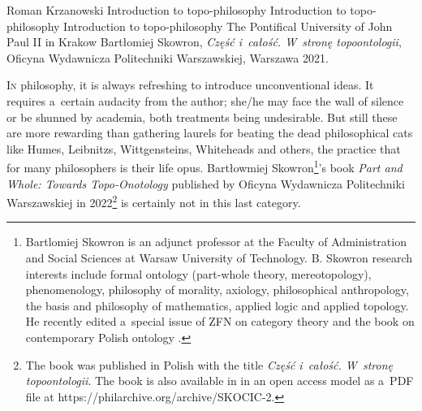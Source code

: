 \begin{newrevengenv}{Roman Krzanowski}
	{Introduction to topo-philosophy}
	{Introduction to topo-philosophy}
	{Introduction to topo-philosophy}
	{The Pontifical University of John Paul II in Krakow}
	{Bartłomiej Skowron, \textit{Część i~całość. W~stronę topoontologii}, Oficyna Wydawnicza Politechniki Warszawskiej, Warszawa 2021.}










\lettrine[loversize=0.13,lines=2,lraise=-0.03,nindent=0em,findent=0.2pt]%
{I}n philosophy, it is always refreshing to introduce unconventional ideas. It requires a~certain audacity from the author; she/he may face the wall of silence or be shunned by academia, both treatments being undesirable. But still these are more rewarding than gathering laurels for beating the dead philosophical cats like Humes, Leibnitzs, Wittgensteins, Whiteheads and others, the practice that for many philosophers is their life opus. Bartłowmiej Skowron\footnote{Bartlomiej Skowron is an adjunct professor at the Faculty of Administration and Social Sciences at Warsaw University of Technology. B. Skowron research interests include formal ontology (part-whole theory, mereotopology), phenomenology, philosophy of morality, axiology, philosophical anthropology, the basis and philosophy of mathematics, applied logic and applied topology. He recently edited a~special issue of ZFN on category theory 
\parencite[see editorial note:][]{eckstein_is_2020} %
 and the book on contemporary Polish ontology 
\parencites[][]{skowron_contemporary_2020}[reviewed by][]{krzanowski_contemporary_2020}.%
}'s book \textit{Part and Whole: Towards Topo-Onotology} published by Oficyna Wydawnicza Politechniki Warszawskiej in 2022\footnote{The book was published in Polish with the title \textit{Część i~całość. W~stronę topoontologii}. The book is also available in in an open access model as a~PDF file at https://philarchive.org/archive/SKOCIC-2.} is certainly not in this last category.




\end{newrevengenv}
